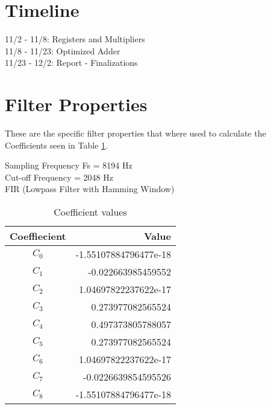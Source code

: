 \documentclass[12pt]{article}
\begin{document}
\section{Timeline}

11/2 - 11/8: Registers and Multipliers \\
11/8 - 11/23: Optimized Adder \\
11/23 - 12/2: Report - Finalizations \\

\section{Filter Properties}
These are the specific filter properties that where used to calculate the Coefficients seen in Table \ref{tab:coefficients}.

Sampling Frequency Fs = 8194 Hz \\
Cut-off Frequency = 2048 Hz \\
FIR (Lowpass Filter with Hamming Window) \\

\begin{table}[ht]
\centering
\begin{tabular}{ c | r }
\hline
Coeffiecient & Value \\
\hline \hline
$C_0$ & -1.55107884796477e-18 \\
$C_1$ & -0.022663985459552 \\
$C_2$ & 1.04697822237622e-17 \\
$C_3$ & 0.273977082565524 \\
$C_4$ & 0.497373805788057 \\
$C_5$ & 0.273977082565524 \\
$C_6$ & 1.04697822237622e-17 \\
$C_7$ & -0.0226639854595526 \\
$C_8$ & -1.55107884796477e-18 \\
\end{tabular}
\caption{Coefficient values}
\label{tab:coefficients}
\end{table}





\fi
\end{document}
